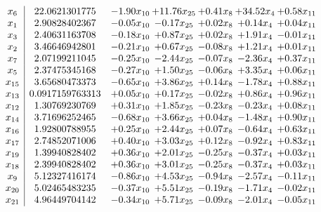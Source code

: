 \documentclass[8pt]{article}
\begin{document}
\[\begin{array}{c| c c@{\hskip 2pt} c@{\hskip 2pt} c@{\hskip 2pt} c@{\hskip 2pt} c@{\hskip 2pt} }
 x_{6}   &  22.0621301775 & -1.90 x_{10} & + 11.76 x_{25} & +  0.41 x_{8} & + 34.52 x_{4} & +  0.58 x_{11}\\
 x_{1}   &  2.90828402367 & -0.05 x_{10} & -0.17 x_{25} & +  0.02 x_{8} & +  0.14 x_{4} & +  0.04 x_{11}\\
 x_{3}   &  2.40631163708 & -0.18 x_{10} & +  0.87 x_{25} & +  0.02 x_{8} & +  1.91 x_{4} & -0.01 x_{11}\\
 x_{2}   &  3.46646942801 & -0.21 x_{10} & +  0.67 x_{25} & -0.08 x_{8} & +  1.21 x_{4} & +  0.01 x_{11}\\
 x_{7}   &  2.07199211045 & -0.25 x_{10} & -2.44 x_{25} & -0.07 x_{8} & -2.36 x_{4} & +  0.37 x_{11}\\
 x_{5}   &  2.37475345168 & -0.27 x_{10} & +  1.50 x_{25} & -0.06 x_{8} & +  3.35 x_{4} & +  0.06 x_{11}\\
 x_{15}   &  3.65680473373 & -0.65 x_{10} & +  3.86 x_{25} & +  0.14 x_{8} & -1.78 x_{4} & +  0.88 x_{11}\\
 x_{13}   &  0.0917159763313 & +  0.05 x_{10} & +  0.17 x_{25} & -0.02 x_{8} & +  0.86 x_{4} & +  0.96 x_{11}\\
 x_{12}   &  1.30769230769 & +  0.31 x_{10} & +  1.85 x_{25} & -0.23 x_{8} & -0.23 x_{4} & +  0.08 x_{11}\\
 x_{14}   &  3.71696252465 & -0.68 x_{10} & +  3.66 x_{25} & +  0.04 x_{8} & -1.48 x_{4} & +  0.90 x_{11}\\
 x_{16}   &  1.92800788955 & +  0.25 x_{10} & +  2.44 x_{25} & +  0.07 x_{8} & -0.64 x_{4} & +  0.63 x_{11}\\
 x_{17}   &  2.74852071006 & +  0.40 x_{10} & +  3.03 x_{25} & +  0.12 x_{8} & -0.92 x_{4} & +  0.83 x_{11}\\
 x_{19}   &  1.39940828402 & +  0.36 x_{10} & +  2.01 x_{25} & -0.25 x_{8} & -0.37 x_{4} & +  0.03 x_{11}\\
 x_{18}   &  2.39940828402 & +  0.36 x_{10} & +  3.01 x_{25} & -0.25 x_{8} & -0.37 x_{4} & +  0.03 x_{11}\\
 x_{9}   &  5.12327416174 & -0.86 x_{10} & +  4.53 x_{25} & -0.94 x_{8} & -2.57 x_{4} & -0.11 x_{11}\\
 x_{20}   &  5.02465483235 & -0.37 x_{10} & +  5.51 x_{25} & -0.19 x_{8} & -1.71 x_{4} & -0.02 x_{11}\\
 x_{21}   &  4.96449704142 & -0.34 x_{10} & +  5.71 x_{25} & -0.09 x_{8} & -2.01 x_{4} & -0.05 x_{11}\\

\end{array}\]
\end{document}
